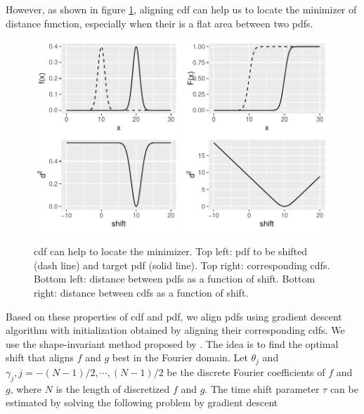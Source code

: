 However, as shown in figure \ref{pic: cdf better}, aligning cdf can help us to locate the minimizer of distance function, especially when their is a flat area between two pdfs.

\begin{figure}[H]
\includegraphics[width=0.49\textwidth]{../simulation/plots/pdf_vs_cdf_a}
\includegraphics[width=0.49\textwidth]{../simulation/plots/pdf_vs_cdf_b}
\caption{ cdf can help to locate the minimizer. Top left: pdf to be shifted (dash line) and target pdf (solid line). Top right: corresponding cdfs. Bottom left: distance between pdfs as a function of shift. Bottom right: distance between cdfs as a function of shift.}
\label{pic: cdf better}
\end{figure}

Based on these properties of cdf and pdf, we align pdfs using gradient descent algorithm with initialization obtained by aligning their corresponding cdfs. 
We use the shape-invariant method proposed by \citet{Bigot2013}.
The idea is to find the optimal shift that aligns $f$ and $g$ best in the Fourier domain.
Let $\theta_j$ and $\gamma_j, j=-(N-1)/2,\cdots,(N-1)/2$ be the discrete Fourier coefficients of $f$ and $g$, where $N$ is the length of discretized $f$ and $g$. The time shift parameter $\tau$ can be estimated by solving the following problem by gradient descent

